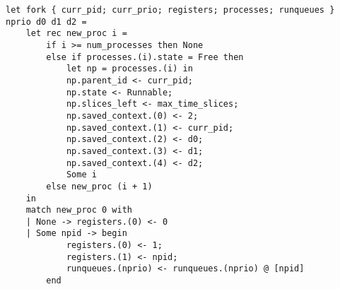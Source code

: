 \documentclass[french, toc]{../cs-classes/cs-classes}
\begin{document}
\begin{verbatim}
let fork { curr_pid; curr_prio; registers; processes; runqueues } nprio d0 d1 d2 =
    let rec new_proc i =
        if i >= num_processes then None
        else if processes.(i).state = Free then
            let np = processes.(i) in
            np.parent_id <- curr_pid;
            np.state <- Runnable;
            np.slices_left <- max_time_slices;
            np.saved_context.(0) <- 2;
            np.saved_context.(1) <- curr_pid;
            np.saved_context.(2) <- d0;
            np.saved_context.(3) <- d1;
            np.saved_context.(4) <- d2;
            Some i
        else new_proc (i + 1)
    in
    match new_proc 0 with
    | None -> registers.(0) <- 0
    | Some npid -> begin
            registers.(0) <- 1;
            registers.(1) <- npid;
            runqueues.(nprio) <- runqueues.(nprio) @ [npid]
        end
\end{verbatim}
\end{document}

